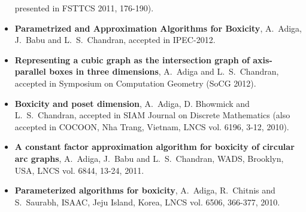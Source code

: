 \documentclass{article}
\newcommand{\ignore}[1]{}
\begin{document}
\begin{itemize}
presented in FSTTCS 2011, 176-190).
\item \textbf{Parametrized and Approximation Algorithms for Boxicity},
A.~Adiga, J.~Babu and L.~S.~Chandran, accepted in IPEC-2012. 
\item \textbf{Representing a cubic graph as the intersection graph of
axis-parallel boxes in three dimensions}, A.~Adiga and L.~S.~Chandran,
accepted in Symposium on Computation Geometry (SoCG 2012).
\item \textbf{Boxicity and poset dimension}, A.~Adiga, D. Bhowmick and
L.~S.~Chandran, accepted in SIAM Journal on Discrete Mathematics (also
accepted in COCOON, Nha Trang, Vietnam, LNCS vol. 6196, 3-12,
2010).\ignore{\vspace{2mm}\\
\begin{minipage}{.2cm}
\mbox{}
\end{minipage}
\begin{minipage}{16cm}
\it In this paper we related the dimension of a poset $\mathcal{P}$ to the
boxicity of its underlying comparability graph $G_{\mathcal{P}}$. This
result has significant consequences for both parameters: (1) We showed
that $\mbox{dim}{\mathcal{P}}\le \mbox{\textnormal{treewidth}}(G_{\mathcal{P}})$. (2) It
is hard to approximate boxicity of a graph within a factor of
$\sqrt{n}$, where $n$ is the size of the graph. (3) We improved some bounds
for boxicity in terms of its maximum degree.
\end{minipage}}
\item \textbf{A constant factor approximation algorithm for boxicity of
circular arc graphs}, A.~Adiga, J.~Babu and L.~S.~Chandran, 
WADS, Brooklyn, USA, LNCS vol. 6844, 13-24, 2011. 
\item \textbf{Parameterized algorithms for boxicity}, A.~Adiga, R.~Chitnis
and S.~Saurabh, ISAAC, Jeju Island, Korea, LNCS vol. 6506, 366-377,
2010.\ignore{\vspace{2mm}\\
\begin{minipage}{.2cm} \mbox{}
\end{minipage}
\begin{minipage}{16cm}
\it Here, we initiated a study of structural parameterization of
boxicity. Our main result is that boxicity of a graph is fixed parameter
tractable when parameterized by vertex cover number. We have also given
approximation algorithms for boxicity when parameterized by feedback
vertex cover number and max leaf number.
\end{minipage}}

\end{itemize}
\end{document}
